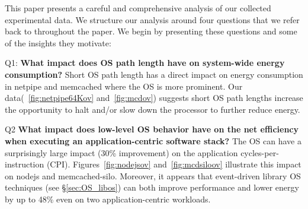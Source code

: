 This paper presents a careful and comprehensive analysis of
our collected experimental data.
We structure our analysis around four questions
that we refer back to throughout the paper.
We begin by presenting these questions
and some of the insights they motivate:
\begin{compactdesc}
\item[Q1:] {\bf What impact does OS path length have on system-wide energy consumption?}
Short OS path length has a direct impact on energy consumption in netpipe and memcached where the OS is more prominent.
Our data(~\ref{fig:netpipe64Kov} and~\ref{fig:mcdov}) suggests short OS path lengths increase the opportunity to halt and/or slow down the processor to further reduce energy.


\item[Q2] {\bf What impact does low-level OS behavior have on the net efficiency when executing an application-centric software stack?}
The OS can have a surprisingly large impact (30\% improvement)
on the application cycles-per-instruction (CPI).
Figures~\ref{fig:nodejsov} and~\ref{fig:mcdsiloov}
illustrate this impact on nodejs and memcached-silo. Moreover, it appears that event-driven library OS techniques (see \S\ref{sec:OS_libos}) can both improve performance and lower energy by up to 48\% even on two application-centric workloads.




\end{compactdesc}
